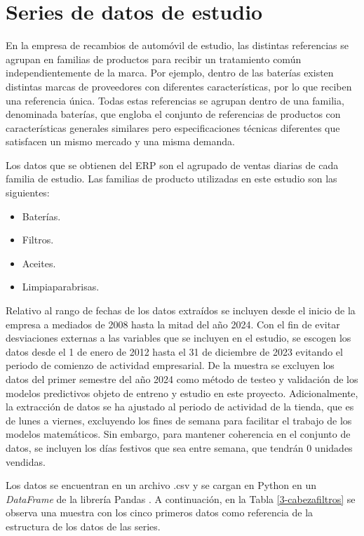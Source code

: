 \section{Series de datos de estudio}

En la empresa de recambios de automóvil de estudio, las distintas referencias se agrupan en familias de productos para recibir un tratamiento común independientemente de la marca. Por ejemplo, dentro de las baterías existen distintas marcas de proveedores con diferentes características, por lo que reciben una referencia única. Todas estas referencias se agrupan dentro de una familia, denominada baterías, que engloba el conjunto de referencias de productos con características generales similares pero especificaciones técnicas diferentes que satisfacen un mismo mercado y una misma demanda. 

Los datos que se obtienen del ERP son el agrupado de ventas diarias de cada familia de estudio. Las familias de producto utilizadas en este estudio son las siguientes:

\begin{itemize}
    \item Baterías.
    \item Filtros.
    \item Aceites.
    \item Limpiaparabrisas.
\end{itemize} 

Relativo al rango de fechas de los datos extraídos se incluyen desde el inicio de la empresa a mediados de 2008 hasta la mitad del año 2024. Con el fin de evitar desviaciones externas a las variables que se incluyen en el estudio, se escogen los datos desde el 1 de enero de 2012 hasta el 31 de diciembre de 2023 evitando el periodo de comienzo de actividad empresarial. De la muestra se excluyen los datos del primer semestre del año 2024 como método de testeo y validación de los modelos predictivos objeto de entreno y estudio en este proyecto. Adicionalmente, la extracción de datos se ha ajustado al periodo de actividad de la tienda, que es de lunes a viernes, excluyendo los fines de semana para facilitar el trabajo de los modelos matemáticos. Sin embargo, para mantener coherencia en el conjunto de datos, se incluyen los días festivos que sea entre semana, que tendrán 0 unidades vendidas.

Los datos se encuentran en un archivo .csv y se cargan en Python en un \textit{DataFrame} de la librería Pandas \cite{pandas}. A continuación, en la Tabla \ref*{3-cabezafiltros} se observa una muestra con los cinco primeros datos como referencia de la estructura de los datos de las series.

